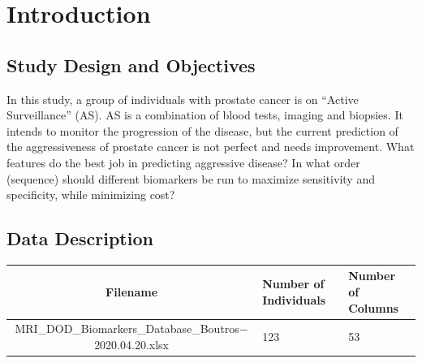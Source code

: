 \documentclass[]{article}
\begin{document}
% 
% 
% 
% 
% 

\section{Introduction}

\subsection{Study Design and Objectives}
\noindent In this study, a group of individuals with prostate cancer is on
“Active Surveillance” (AS). AS is a combination of blood tests, imaging and biopsies. 
It intends to monitor the progression of the disease, but the current prediction of 
the aggressiveness of prostate cancer is not perfect and needs improvement. What features 
do the best job in predicting aggressive disease? In what order (sequence) should 
different biomarkers be run to maximize sensitivity and specificity, while minimizing cost?  

\subsection{Data Description}

\begin{center}
\begin{tabular}{ |c|p{2cm}|p{2cm}|}
\hline
  {\bf Filename} &  {\bf Number of Individuals} & {\bf Number of Columns}  \\
\hline
    MRI\_DOD\_Biomarkers\_Database\_Boutros$-$2020.04.20.xlsx &  123  & 53  \\
\hline
\end{tabular}
\end{center}
\end{document}

